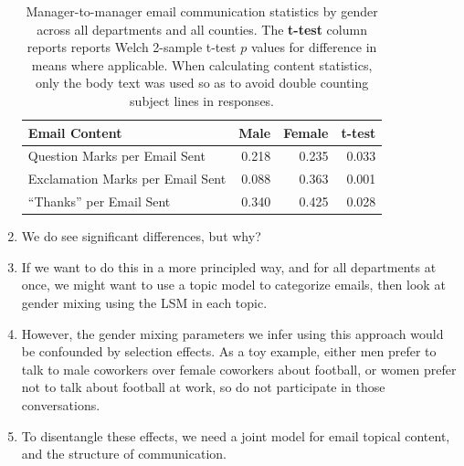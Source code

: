 \documentclass[fleqn]{MJDArticle}
\begin{document}
\begin{enumerate}
	\begin{table}[H]
	\centering
	\begin{tabular}{m{2in}rrr}
	\toprule
	 \textbf{Email Content} & \textbf{Male} & \textbf{Female} & \textbf{t-test} \\
	 \midrule
	 Question Marks per Email Sent & 0.218 & 0.235 & 0.033\\
	 Exclamation Marks per Email Sent & 0.088 & 0.363 & 0.001\\
	 ``Thanks'' per Email Sent & 0.340 & 0.425 & 0.028 \\
	\bottomrule
	\end{tabular}
		\caption{\label{tab:Gender Aggregate Stats} Manager-to-manager email communication statistics by gender across all departments and all counties. The \textbf{t-test} column reports reports Welch 2-sample t-test $p$ values for difference in means where applicable. When calculating content statistics, only the body text was used so as to avoid double counting subject lines in responses.}
	\end{table}
	
	\item We do see significant differences, but why?
	
	\item If we want to do this in a more principled way, and for all departments at once, we might want to use a topic model to categorize emails, then look at gender mixing using the LSM in each topic.
	
	\item However, the gender mixing parameters we infer using this approach would be confounded by selection effects. As a toy example, either men prefer to talk to male coworkers over female coworkers about football, or women prefer not to talk about football at work, so do not participate in those conversations. 
	\item To disentangle these effects, we need a joint model for email topical content, and the structure of communication.
\end{enumerate}
\end{document}
